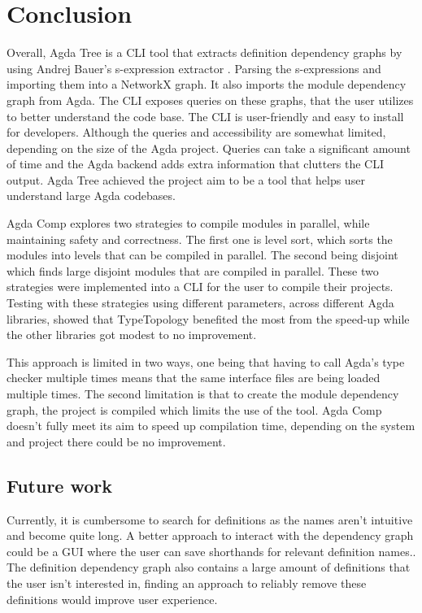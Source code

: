 
\chapter{Conclusion}

Overall, Agda Tree is a CLI tool that extracts definition dependency graphs by
using Andrej Bauer's s-expression extractor \cite{andrej}. Parsing the
s-expressions and importing them into a NetworkX graph. It also imports the
module dependency graph from Agda. The CLI exposes queries on these graphs,
that the user utilizes to better understand the code base. The CLI is
user-friendly and easy to install for developers. Although the queries and
accessibility are somewhat limited, depending on the size of the Agda project.
Queries can take a significant amount of time and the Agda backend adds extra
information that clutters the CLI output. Agda Tree achieved the project aim to
be a tool that helps user understand large Agda codebases.

Agda Comp explores two strategies to compile modules in parallel, while
maintaining safety and correctness. The first one is level sort, which sorts
the modules into levels that can be compiled in parallel. The second being
disjoint which finds large disjoint modules that are compiled in parallel.
These two strategies were implemented into a CLI for the user to compile their
projects. Testing with these strategies using different parameters, across
different Agda libraries, showed that TypeTopology benefited the most from the
speed-up while the other libraries got modest to no improvement.

This approach is limited in two ways, one being that having to call Agda's type
checker multiple times means that the same interface files are being loaded
multiple times. The second limitation is that to create the module dependency
graph, the project is compiled which limits the use of the tool. Agda Comp
doesn't fully meet its aim to speed up compilation time, depending on the
system and project there could be no improvement.

\section{Future work}

Currently, it is cumbersome to search for definitions as the names aren't
intuitive and become quite long. A better approach to interact with the
dependency graph could be a GUI where the user can save shorthands for relevant
definition names.. The definition dependency graph also contains a large amount
of definitions that the user isn't interested in, finding an approach to
reliably remove these definitions would improve user experience.

